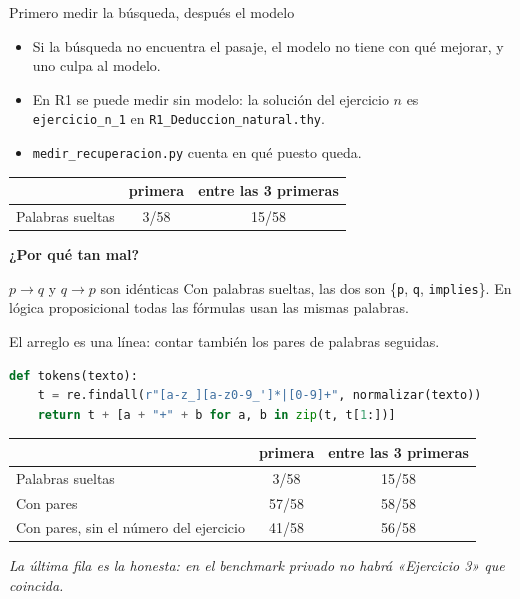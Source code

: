 \documentclass[10pt]{beamer}
\newcommand{\apuesta}[1]{%
  \begin{center}\large\color{resalte}\textbf{#1}\end{center}}
\newcommand{\nota}[1]{{\small\itshape\color{psCom} #1}}
\newcommand{\cd}[1]{\texttt{#1}}
\begin{document}
\begin{frame}{Primero medir la búsqueda, después el modelo}
  \begin{itemize}
    \item Si la búsqueda no encuentra el pasaje, el modelo no tiene con qué
      mejorar, y uno culpa al modelo.
    \item En R1 se puede medir sin modelo: la solución del ejercicio $n$ es
      \cd{ejercicio\_n\_1} en \cd{R1\_Deduccion\_natural.thy}.
    \item \cd{medir\_recuperacion.py} cuenta en qué puesto queda.
  \end{itemize}
  \vspace{0.6em}
  \begin{center}
  \begin{tabular}{@{}lcc@{}}
    \toprule
    & primera & entre las 3 primeras \\
    \midrule
    Palabras sueltas & 3/58 & 15/58 \\
    \bottomrule
  \end{tabular}
  \end{center}
  \apuesta{¿Por qué tan mal?}
\end{frame}

\begin{frame}[fragile]{$p \longrightarrow q$ y $q \longrightarrow p$ son idénticas}
  Con palabras sueltas, las dos son \{\cd{p}, \cd{q}, \cd{implies}\}. En
  lógica proposicional todas las fórmulas usan las mismas palabras.

  \vspace{0.4em}
  El arreglo es una línea: contar también los \alert{pares de palabras
  seguidas}.
\begin{lstlisting}[language=Python]
def tokens(texto):
    t = re.findall(r"[a-z_][a-z0-9_']*|[0-9]+", normalizar(texto))
    return t + [a + "+" + b for a, b in zip(t, t[1:])]
\end{lstlisting}
  \begin{center}
  \begin{tabular}{@{}lcc@{}}
    \toprule
    & primera & entre las 3 primeras \\
    \midrule
    Palabras sueltas & 3/58 & 15/58 \\
    \alert{Con pares} & \alert{57/58} & \alert{58/58} \\
    Con pares, sin el número del ejercicio & 41/58 & 56/58 \\
    \bottomrule
  \end{tabular}
  \end{center}
  \nota{La última fila es la honesta: en el benchmark privado no habrá
  «Ejercicio 3» que coincida.}
\end{frame}
\end{document}
